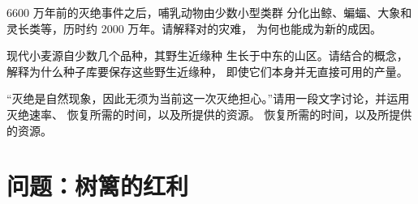 \begin{exercise}[$\star\star\star$]\label{exo:g10:biodiversity-scales:13}
6600 万年前的灭绝事件之后，哺乳动物由少数小型类群
分化出鲸、蝙蝠、大象和灵长类等，历时约
2000 万年。请解释对的灾难，
为何也能成为新的成因。
\end{exercise}

\begin{exercise}[$\star\star\star$]\label{exo:g10:biodiversity-scales:14}
现代小麦源自少数几个品种，其野生近缘种
生长于中东的山区。请结合的概念，
解释为什么种子库要保存这些野生近缘种，
即使它们本身并无直接可用的产量。
\end{exercise}

\begin{exercise}[$\star\star\star$]\label{exo:g10:biodiversity-scales:15}
“灭绝是自然现象，因此无须为当前这一次灭绝担心。”请用一段文字讨论，并运用灭绝速率、
恢复所需的时间，以及所提供的资源。
恢复所需的时间，以及所提供的资源。
\end{exercise}

\section{问题：树篱的红利}

